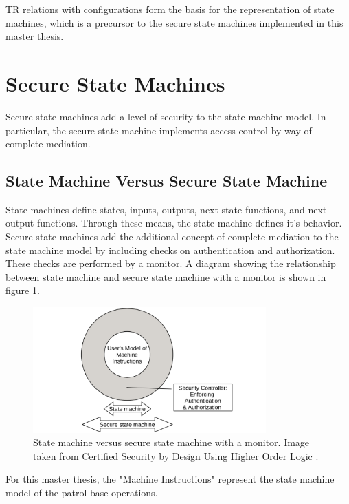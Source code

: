 \documentclass[../../main/main.tex]{subfiles}
\begin{document}
TR relations with configurations form the basis for the  representation of state machines, which is a precursor to the secure state machines implemented in this master thesis.  


\section{Secure State Machines}\label{sec:ssm}
Secure state machines add a level of security to the state machine model.  In particular, the secure state machine implements access control by way of complete mediation.   

\subsection{State Machine Versus Secure State Machine}
State machines define states, inputs, outputs, next-state functions, and next-output functions.  Through these means, the state machine defines it's behavior.  Secure state machines add the additional concept of complete mediation to the state machine model by including checks on authentication and authorization.  These checks are performed by a monitor.  A diagram showing the relationship between state machine and secure state machine with a monitor is shown in figure \ref{smVSssm}.  

\begin{figure}[!h!]
\centering
\includegraphics[width=0.8\textwidth]{../figures/smVSssm}
\caption{\label{smVSssm} State machine versus secure state machine with a monitor.  Image taken from Certified Security by Design Using Higher Order Logic \cite{certmanual}.}
\end{figure}

For this master thesis, the "Machine Instructions" represent the state machine model of the patrol base operations.
\end{document}
